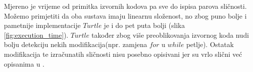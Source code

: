 \noindent Mjereno je vrijeme od primitka izvornih kodova pa sve do ispisa parova sličnosti. Možemo primjetiti da oba sustava imaju linearnu složenost, no zbog puno bolje i pametnije implementacije $Turtle$ je i do pet puta bolji (slika \ref{fig:execution_time}). $Turtle$ također zbog više preoblikovanja izvornog koda nudi bolju detekciju nekih modifikacija(npr. zamjena $for$ u $while$ petlje). Ostatak modifikacija te izračunatih sličnosti nisu posebno opisivani jer su vrlo slični već opisanima u \cite{plagijator}.
